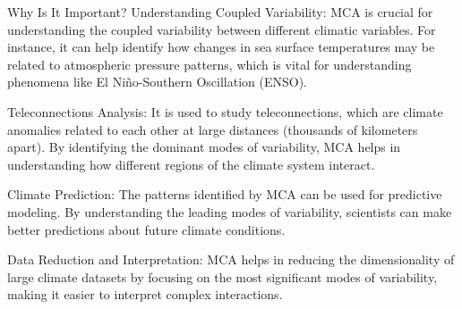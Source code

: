 Why Is It Important?
Understanding Coupled Variability: MCA is crucial for understanding the coupled variability between different climatic variables. For instance, it can help identify how changes in sea surface temperatures may be related to atmospheric pressure patterns, which is vital for understanding phenomena like El Niño-Southern Oscillation (ENSO).

Teleconnections Analysis: It is used to study teleconnections, which are climate anomalies related to each other at large distances (thousands of kilometers apart). By identifying the dominant modes of variability, MCA helps in understanding how different regions of the climate system interact.

Climate Prediction: The patterns identified by MCA can be used for predictive modeling. By understanding the leading modes of variability, scientists can make better predictions about future climate conditions.

Data Reduction and Interpretation: MCA helps in reducing the dimensionality of large climate datasets by focusing on the most significant modes of variability, making it easier to interpret complex interactions.



